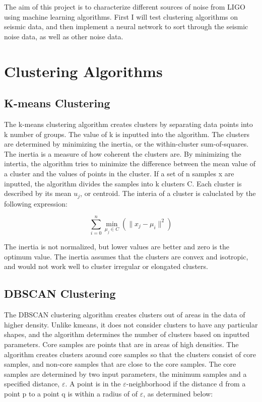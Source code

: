 \documentclass[colorlinks=true,pdfstartview=FitV,linkcolor=blue,
            citecolor=red,urlcolor=magenta]{ligodoc}
\begin{document}
\par The aim of this project is to characterize different sources of noise from LIGO using machine learning algorithms. First I  will test clustering algorithms on seismic data, and then implement a neural network to sort through the seismic noise data, as well as other noise data.

\section{Clustering Algorithms}

\subsection{K-means Clustering}

\indent

\par The k-means clustering algorithm creates clusters by separating data points into k number of groups. The value of k is inputted into the algorithm. The clusters are determined by minimizing the inertia, or the within-cluster sum-of-squares. The inertia is a measure of how coherent the clusters are. By minimizing the intertia, the algorithm tries to minimize the difference between the mean value of a cluster and the values of points in the cluster. If a set of n samples x are inputted, the algorithm divides the samples into k clusters C. Each cluster is described by its mean \(u_j\), or centroid. The interia of a cluster is caluclated by the following expression:

\[\sum_{i=0}^{n} \min_{\mu_j \in  C}(\|x_j-\mu_i\|^2)\]

\par The inertia is not normalized, but lower values are better and zero is the optimum value. The inertia assumes that the clusters are convex and isotropic, and would not work well to cluster irregular or elongated clusters. \cite{Citation2} 

\subsection{DBSCAN Clustering}

\indent

\par The DBSCAN clustering algorithm creates clusters out of areas in the data of higher density. Unlike kmeans, it does not consider clusters to have any particular shapes, and the algorithm determines the number of clusters based on inputted parameters. Core samples are points that are in areas of high densities. The algorithm creates clusters around core samples so that the clusters consist of core samples, and non-core samples that are close to the core samples. The core samples are determined by two input parameters, the minimum samples and a specified distance, $\varepsilon$. A point is in the $\varepsilon$-neighborhood if the distance d from a point p to a point q is within a radius of of $\varepsilon$, as determined below: 
\end{document}
